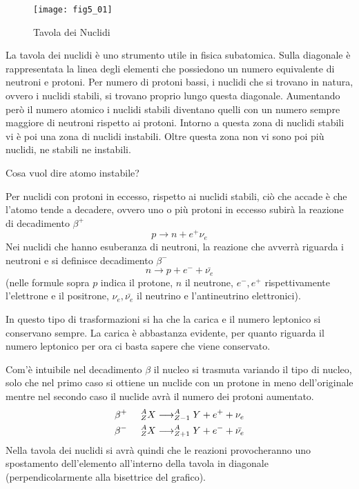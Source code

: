 \begin{figure}[h]
\centering
\texttt{[image: fig5\_01]}
\caption{Tavola dei Nuclidi}
\label{fig:5_01}
\end{figure}
La tavola dei nuclidi è uno strumento utile in fisica subatomica.
Sulla diagonale è rappresentata la linea degli elementi che possiedono un numero equivalente di neutroni e protoni.
Per numero di protoni bassi, i nuclidi che si trovano in natura, ovvero i nuclidi stabili, si trovano proprio lungo questa diagonale. 
Aumentando però il numero atomico i nuclidi stabili diventano quelli con un numero sempre maggiore di neutroni rispetto ai protoni.
Intorno a questa zona di nuclidi stabili vi è poi una zona di nuclidi instabili.
Oltre questa zona non vi sono poi più nuclidi, ne stabili ne instabili.

Cosa vuol dire atomo instabile?

Per nuclidi con protoni in eccesso, rispetto ai nuclidi stabili, ciò che accade è che l'atomo tende a decadere, ovvero uno o più protoni in eccesso subirà la reazione di decadimento $\beta^+$
\begin{equation}
p\longrightarrow n+e^+\nu_e
\end{equation}
Nei nuclidi che hanno esuberanza di neutroni, la reazione che avverrà riguarda i neutroni e si definisce decadimento $\beta^-$
\begin{equation}
n\longrightarrow p+e^- +\bar{\nu_e}
\end{equation}
(nelle formule sopra $p$ indica il protone, $n$ il neutrone, $e^-, e^+$ rispettivamente l'elettrone e il positrone, $\nu_e, \bar{\nu_e} $ il neutrino e l'antineutrino elettronici).

In questo tipo di trasformazioni si ha che la carica e il numero leptonico si conservano sempre. 
La carica è abbastanza evidente, per quanto riguarda il numero leptonico per ora ci basta sapere che viene conservato.

Com'è intuibile nel decadimento $\beta$ il nucleo si trasmuta variando il tipo di nucleo, solo che nel primo caso si ottiene un nuclide con un protone in meno dell'originale mentre nel secondo caso il nuclide avrà il numero dei protoni aumentato.
\begin{equation}
\begin{split}
\beta^+\hspace{0.5cm}^A_ZX \longrightarrow ^A_{Z-1}Y+e^+ +\nu_e\\
\beta^-\hspace{0.5cm} ^A_ZX \longrightarrow ^A_{Z+1}Y+e^- +\bar{\nu_e}
\end{split}
\end{equation}
Nella tavola dei nuclidi si avrà quindi che le reazioni provocheranno uno spostamento dell'elemento all'interno della tavola in diagonale (perpendicolarmente alla bisettrice del grafico).

